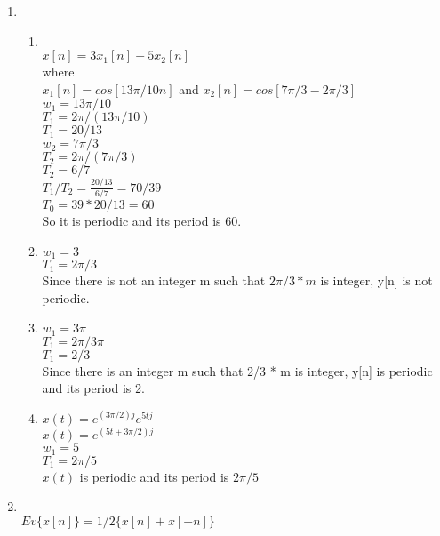 \documentclass[10pt,a4paper, margin=1in]{article}
\begin{document}
\begin{enumerate}
\item 
\ \\
    \begin{enumerate}
    \item %
    \ \\
    	$x[n] = 3x_1[n] + 5x_2[n]$ \\
    	where\\
    	 $x_1[n] = cos[13\pi / 10 n]$ and $x_2[n] = cos[7\pi /3 - 2\pi /3]$ \\
    	$w_1 = 13\pi/10$ \\
    	$T_1 = 2\pi / (13\pi/10)$ \\
    	$T_1 = 20/13$ \\
    	$w_2 = 7\pi/3$ \\
    	$T_2 = 2\pi/ (7\pi/3)$ \\
    	$T_2 = 6/7$ \\
    	$T_1/T_2 = \frac{20/13}{6/7} = 70/39 $\\
    	$T_0 = 39 * 20/13 = 60 $\\
    	So it is periodic and its period is 60.
    \item %
    $w_1=3$ \\
    $T_1 = 2\pi/ 3$\\
    Since there is not an integer m such that $ 2\pi/ 3 * m$ is integer, y[n] is not periodic. \\ 
    \item %
    $w_1=3\pi$ \\
    $T_1 = 2\pi/ 3\pi$\\
    $T_1 = 2/3 $ \\
    Since there is an integer m such that 2/3 * m is integer, y[n] is periodic and its period is 2. \\
    \item %
    $x(t) = e^{(3\pi/2)j}e^{5tj}$ \\
    $x(t) = e^{(5t+3\pi/2)j}$\\
    $w_1 = 5$ \\
    $T_1 = 2\pi/5 $ \\
    $x(t)$ is periodic and its period is $2\pi/5$ \\
    \end{enumerate}

\item %
\ \\
$Ev\{x[n]\} = 1/2\{x[n] + x[-n]\} $\\


\end{enumerate}
\end{document}
